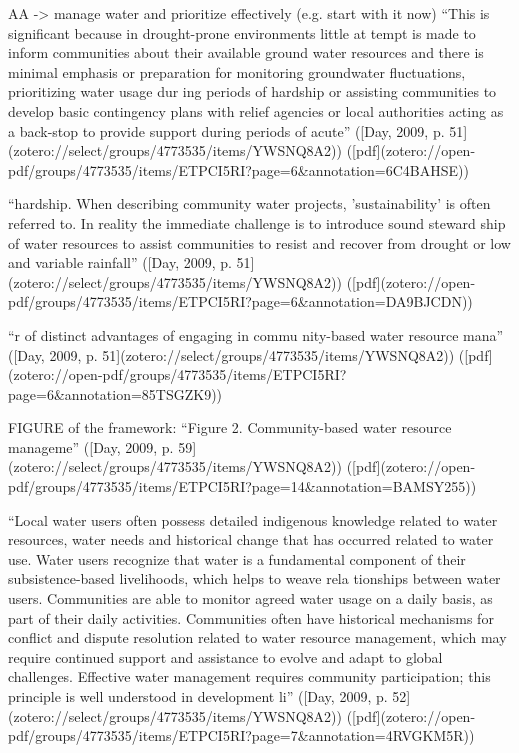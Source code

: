 AA -> manage water and prioritize effectively (e.g. start with it now)
“This is significant because in drought-prone environments little at tempt is made to inform communities about their available ground water resources and there is minimal emphasis or preparation for monitoring groundwater fluctuations, prioritizing water usage dur ing periods of hardship or assisting communities to develop basic contingency plans with relief agencies or local authorities acting as a back-stop to provide support during periods of acute” ([Day, 2009, p. 51](zotero://select/groups/4773535/items/YWSNQ8A2)) ([pdf](zotero://open-pdf/groups/4773535/items/ETPCI5RI?page=6&annotation=6C4BAHSE))

“hardship. When describing community water projects, 'sustainability' is often referred to. In reality the immediate challenge is to introduce sound steward ship of water resources to assist communities to resist and recover from drought or low and variable rainfall” ([Day, 2009, p. 51](zotero://select/groups/4773535/items/YWSNQ8A2)) ([pdf](zotero://open-pdf/groups/4773535/items/ETPCI5RI?page=6&annotation=DA9BJCDN))


“r of distinct advantages of engaging in commu nity-based water resource mana” ([Day, 2009, p. 51](zotero://select/groups/4773535/items/YWSNQ8A2)) ([pdf](zotero://open-pdf/groups/4773535/items/ETPCI5RI?page=6&annotation=85TSGZK9))

FIGURE of the framework: “Figure 2. Community-based water resource manageme” ([Day, 2009, p. 59](zotero://select/groups/4773535/items/YWSNQ8A2)) ([pdf](zotero://open-pdf/groups/4773535/items/ETPCI5RI?page=14&annotation=BAMSY255))

“Local water users often possess detailed indigenous knowledge related to water resources, water needs and historical change that has occurred related to water use. 
Water users recognize that water is a fundamental component of their subsistence-based livelihoods, which helps to weave rela tionships between water users. 
Communities are able to monitor agreed water usage on a daily basis, as part of their daily activities. 
Communities often have historical mechanisms for conflict and dispute resolution related to water resource management, which may require continued support and assistance to evolve and adapt to global challenges. 
Effective water management requires community participation; this principle is well understood in development li” ([Day, 2009, p. 52](zotero://select/groups/4773535/items/YWSNQ8A2)) ([pdf](zotero://open-pdf/groups/4773535/items/ETPCI5RI?page=7&annotation=4RVGKM5R))





